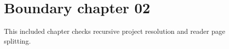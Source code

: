\section{Boundary chapter 02}
\label{sec:boundary-02}
This included chapter checks recursive project resolution and reader page splitting.

